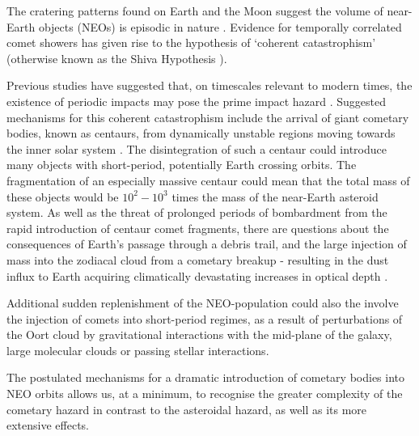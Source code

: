 The cratering patterns found on Earth and the Moon suggest the volume of near-Earth objects (NEOs) is episodic in nature \cite{1998ncdb.conf...21N, 1979Natur.282..455N}. Evidence for temporally correlated comet showers has given rise to the hypothesis of `coherent catastrophism' (otherwise known as the Shiva Hypothesis \cite{Rampino1996}).

Previous studies have suggested that, on timescales relevant to modern times, the existence of periodic impacts may pose the prime impact hazard \cite{ASHER19941}. Suggested mechanisms for this coherent catastrophism include the arrival of giant cometary bodies, known as centaurs, from dynamically unstable regions moving towards the inner solar system \cite{2015A&G....56f6.24N}. The disintegration of such a centaur could introduce many objects with short-period, potentially Earth crossing orbits. The fragmentation of an especially massive centaur could mean that the total mass of these objects would be $10^{2}-10^{3}$ times the mass of the near-Earth asteroid system. As well as the threat of prolonged periods of bombardment from the rapid introduction of centaur comet fragments, there are questions about the consequences of Earth's passage through a debris trail, and the large injection of mass into the zodiacal cloud from a cometary breakup - resulting in the dust influx to Earth acquiring climatically devastating increases in optical depth \cite{2015MNRAS.448...27N, 2001MNRAS.321..463N}.

Additional sudden replenishment of the NEO-population could also the involve the injection of comets into short-period regimes, as a result of perturbations of the Oort cloud by gravitational interactions with the mid-plane of the galaxy, large molecular clouds or passing stellar interactions.

The postulated mechanisms for a dramatic introduction of cometary bodies into NEO orbits allows us, at a minimum, to recognise the greater complexity of the cometary hazard in contrast to the asteroidal hazard, as well as its more extensive effects.




